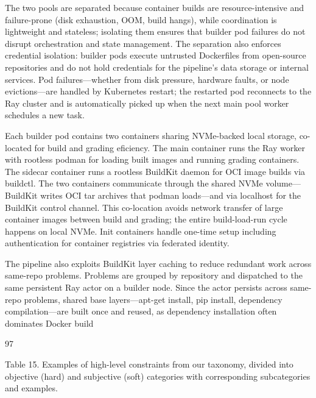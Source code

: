 \documentclass[
  10
]{article}
\begin{document}
The two pools are separated because container builds are
resource-intensive and failure-prone (disk exhaustion, OOM, build
hangs), while coordination is lightweight and stateless; isolating them
ensures that builder pod failures do not disrupt orchestration and state
management. The separation also enforces credential isolation: builder
pods execute untrusted Dockerfiles from open-source repositories and do
not hold credentials for the pipeline's data storage or internal
services. Pod failures---whether from disk pressure, hardware faults, or
node evictions---are handled by Kubernetes restart; the restarted pod
reconnects to the Ray cluster and is automatically picked up when the
next main pool worker schedules a new task.

Each builder pod contains two containers sharing NVMe-backed local
storage, co-located for build and grading eficiency. The main container
runs the Ray worker with rootless podman for loading built images and
running grading containers. The sidecar container runs a rootless
BuildKit daemon for OCI image builds via buildctl. The two containers
communicate through the shared NVMe volume---BuildKit writes OCI tar
archives that podman loads---and via localhost for the BuildKit control
channel. This co-location avoids network transfer of large container
images between build and grading; the entire build-load-run cycle
happens on local NVMe. Init containers handle one-time setup including
authentication for container registries via federated identity.

The pipeline also exploits BuildKit layer caching to reduce redundant
work across same-repo problems. Problems are grouped by repository and
dispatched to the same persistent Ray actor on a builder node. Since the
actor persists across same-repo problems, shared base layers---apt-get
install, pip install, dependency compilation---are built once and
reused, as dependency installation often dominates Docker build

97

Table 15. Examples of high-level constraints from our taxonomy, divided
into objective (hard) and subjective (soft) categories with
corresponding subcategories and examples.
\end{document}
